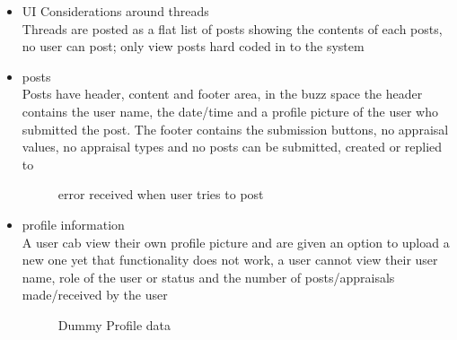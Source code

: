 \begin {itemize}
\item 	UI Considerations around threads\\
Threads are posted as a flat list of posts showing the contents of each posts, no user can post; only view posts hard coded in to the system\\

\item	posts\\
Posts have header, content and footer area, in the buzz space the header contains the user name, the date/time and a profile picture of the user who submitted the post.  The footer contains the submission buttons, no appraisal values, no appraisal types and no posts can be submitted, created or replied to 

\begin{figure}[h!]
  \centering
  \caption{error received when user tries to post }
\end{figure}

 

\item {profile information}\\
A user cab view their own profile picture and are given an option to upload a new one yet that functionality does not work, a user cannot view their user name, role of the user or status and the number of posts/appraisals made/received by the user
\\

 \begin{figure}[h!]
  \centering
  \caption{Dummy Profile data }
\end{figure}   


  
\end {itemize}